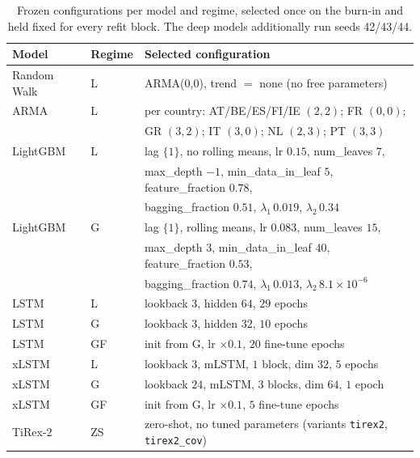 
\appendix

\begin{table}[htbp]
  \centering\small
  \caption{Frozen configurations per model and regime, selected once on the burn-in and held fixed for every refit block. The deep models additionally run seeds 42/43/44.}
  \label{tab:app_frozen}
  \begin{tabular}{@{}lll@{}}
    \toprule
    \textbf{Model} & \textbf{Regime} & \textbf{Selected configuration} \\
    \midrule
    Random Walk & L  & ARMA(0,0), trend $=$ none (no free parameters) \\
    \addlinespace
    ARMA        & L  & per country: AT/BE/ES/FI/IE $(2,2)$; FR $(0,0)$; \\
                &    & \quad GR $(3,2)$; IT $(3,0)$; NL $(2,3)$; PT $(3,3)$ \\
    \addlinespace
    LightGBM    & L  & lag $\{1\}$, no rolling means, lr $0.15$, num\_leaves $7$, \\
                &    & \quad max\_depth $-1$, min\_data\_in\_leaf $5$, feature\_fraction $0.78$, \\
                &    & \quad bagging\_fraction $0.51$, $\lambda_1\,0.019$, $\lambda_2\,0.34$ \\
    \addlinespace
    LightGBM    & G  & lag $\{1\}$, rolling means, lr $0.083$, num\_leaves $15$, \\
                &    & \quad max\_depth $3$, min\_data\_in\_leaf $40$, feature\_fraction $0.53$, \\
                &    & \quad bagging\_fraction $0.74$, $\lambda_1\,0.013$, $\lambda_2\,8.1\times10^{-6}$ \\
    \addlinespace
    LSTM        & L  & lookback $3$, hidden $64$, $29$ epochs \\
    LSTM        & G  & lookback $3$, hidden $32$, $10$ epochs \\
    LSTM        & GF & init from G, lr $\times 0.1$, $20$ fine-tune epochs \\
    \addlinespace
    xLSTM       & L  & lookback $3$, mLSTM, $1$ block, dim $32$, $5$ epochs \\
    xLSTM       & G  & lookback $24$, mLSTM, $3$ blocks, dim $64$, $1$ epoch \\
    xLSTM       & GF & init from G, lr $\times 0.1$, $5$ fine-tune epochs \\
    \addlinespace
    TiRex-2     & ZS & zero-shot, no tuned parameters (variants \texttt{tirex2}, \texttt{tirex2\_cov}) \\
    \bottomrule
  \end{tabular}
\end{table}

